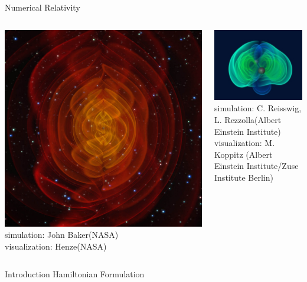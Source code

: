 \documentclass[xcolor=dvipsnames]{beamer}
\begin{document}
	\begin{frame}
		Numerical Relativity
		\begin{columns}[c]
			\column{2in}
			\begin{center}
				\includegraphics[scale=0.07]{nr-baker.jpg}\\
				\tiny{simulation: John Baker(NASA)}\\
				\tiny{visualization: Henze(NASA)}
			\end{center}
			\column{2in}
			\begin{center}
				\includegraphics[scale=0.5]{nr-mpg.jpg}\\
				\tiny{simulation: C. Reisswig, L. Rezzolla(Albert Einstein Institute)}\\
				\tiny{visualization: M. Koppitz (Albert Einstein Institute/Zuse Institute Berlin)}
			\end{center}
		\end{columns}		
	\end{frame}
	\begin{frame}{Introduction}
		Hamiltonian Formulation
	\end{frame}
\end{document}
